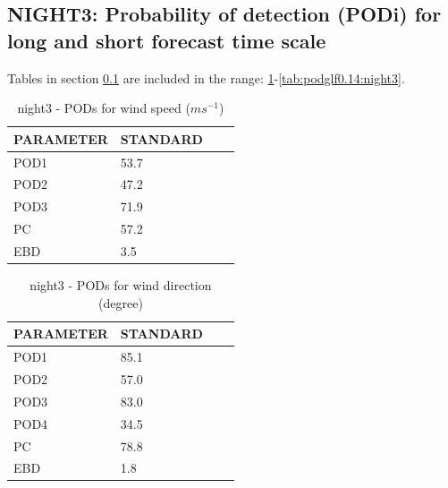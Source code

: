 \subsection{NIGHT3: Probability of detection (PODi) for long and short forecast time scale}\label{subsec:night3:pod}
Tables in section \ref{subsec:night3:pod} are included in the range: \ref{tab:podws:night3}-\ref{tab:podglf0.14:night3}.
\begin{table}[h!]
\begin{center}
\begin{tabular}{|l|l|l|l|}
\hline
\multicolumn{1}{|c|}{\cellcolor[HTML]{C0C0C0}\textbf{PARAMETER}} & \multicolumn{1}{c|}{\cellcolor[HTML]{C0C0C0}\textbf{STANDARD}} \\
\hline
\cellcolor[HTML]{C0C0C0}POD1  & 53.7                                \\
\cellcolor[HTML]{C0C0C0}POD2  & 47.2                                \\
\cellcolor[HTML]{C0C0C0}POD3  & 71.9                                \\
\cellcolor[HTML]{C0C0C0}PC    & 57.2                                  \\
\cellcolor[HTML]{C0C0C0}EBD   & 3.5                                 \\
\hline
\end{tabular}
\caption{night3 - PODs for wind speed ($m s^{-1}$)}
\label{tab:podws:night3}
\end{center}
\end{table}
\begin{table}[p!]
\begin{center}
\begin{tabular}{|l|l|l|l|}
\hline
\multicolumn{1}{|c|}{\cellcolor[HTML]{C0C0C0}\textbf{PARAMETER}} & \multicolumn{1}{c|}{\cellcolor[HTML]{C0C0C0}\textbf{STANDARD}}\\
\hline
\cellcolor[HTML]{C0C0C0}POD1  & 85.1      \\
\cellcolor[HTML]{C0C0C0}POD2  & 57.0      \\
\cellcolor[HTML]{C0C0C0}POD3  & 83.0      \\
\cellcolor[HTML]{C0C0C0}POD4  & 34.5      \\
\cellcolor[HTML]{C0C0C0}PC    & 78.8        \\
\cellcolor[HTML]{C0C0C0}EBD   & 1.8       \\
\hline
\end{tabular}
\caption{night3 - PODs for wind direction (degree)}
\label{tab:podwd:night3}
\end{center}
\end{table}
